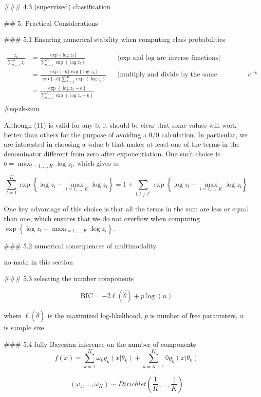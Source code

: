 ### 4.3 (supervised) classification

## 5. Practical Considerations



### 5.1 Ensuring numerical stability when computing class probabilities


$$
\begin{aligned}
\frac{z_k}{\sum_{l=1}^K z_l} &= \frac{\exp\{ \log z_k \}}{\sum_{l=1}^K \exp\left\{ \log z_l \right\}} &&  \text{(exp and log are inverse
functions)}\\
&= \frac{\exp\{ -b \}\exp\{ \log z_k \}}{\exp\{ -b \}\sum_{l=1}^K \exp\left\{ \log z_l \right\}} && \text{(multiply and divide by
the same quantity)} \ e^{-b} \\
&= \frac{\exp\left\{ \log z_k - b \right\}}{\sum_{l=1}^K \exp\left\{ \log z_l - b \right\}} \\
\end{aligned}
$$ {#eq-zk-sum}

Although (11) is valid for any b, it should be clear that some values will
work better than others for the purpose of avoiding a 0/0 calculation. In
particular, we are interested in choosing a value b that makes at least one of
the terms in the denominator different from zero after exponentiation. One
such choice is $b=\max_{l=1,\ldots,K} \log z_l$, which gives us

$$
\sum_{l=1}^K \exp\left\{ \log z_l - \max_{l=1,\ldots,K} \log z_l \right\} = 1 + \sum_{l:l \neq l^*} \exp\left\{ \log z_l - \max_{l=1,\ldots,K} \log z_l \right\}
$$

One key advantage of this choice is that all the terms in the sum are less or equal than one, which ensures that we do not overflow
when computing  $\exp\left\{ \log z_l - \max_{l=1,\ldots,K} \log z_l \right\}$.

### 5.2 numerical consequences of multimodality

no math in this section

### 5.3 selecting the number components


$$
\text{BIC} = -2 \ell(\hat{\theta}) + p \log(n)
$$

where $\ell(\hat{\theta})$ is the maximized log-likelihood, $p$ is number of free parameters, $n$ is sample size.

### 5.4 fully Bayesian inference on the number of components
$$
f(x) = \sum_{k=1}^K \omega_k g_k(x | \theta_k) + \sum_{k=K+1}^K 0g_k(x | \theta_k)
$$


$$
(\omega_1, \ldots, \omega_K) \sim Dirichlet( \frac{1}{K}, \ldots , \frac{1}{K} )
$$

